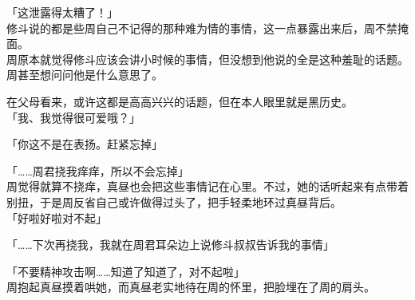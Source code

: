 「这泄露得太糟了！」\\

修斗说的都是些周自己不记得的那种难为情的事情，这一点暴露出来后，周不禁掩面。\\

周原本就觉得修斗应该会讲小时候的事情，但没想到他说的全是这种羞耻的话题。周甚至想问问他是什么意思了。

在父母看来，或许这都是高高兴兴的话题，但在本人眼里就是黑历史。\\

「我、我觉得很可爱哦？」

「你这不是在表扬。赶紧忘掉」

「……周君挠我痒痒，所以不会忘掉」\\

周觉得就算不挠痒，真昼也会把这些事情记在心里。不过，她的话听起来有点带着别扭，于是周反省自己或许做得过头了，把手轻柔地环过真昼背后。\\

「好啦好啦对不起」

「……下次再挠我，我就在周君耳朵边上说修斗叔叔告诉我的事情」

「不要精神攻击啊……知道了知道了，对不起啦」\\

周抱起真昼摸着哄她，而真昼老实地待在周的怀里，把脸埋在了周的肩头。
